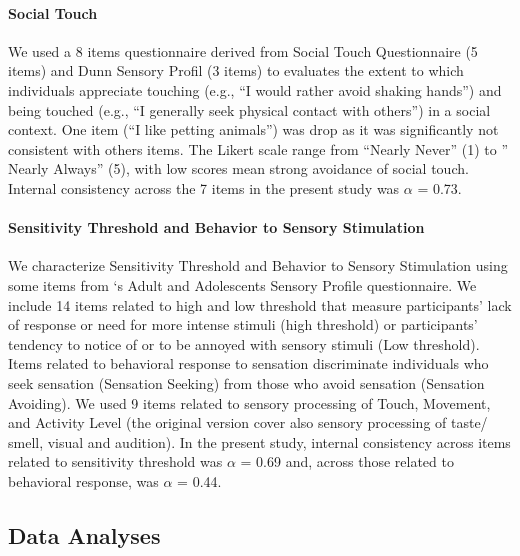 \documentclass[preprint, 3p,
authoryear]{elsarticle} %
\begin{document}
\hypertarget{social-touch}{%
\paragraph{Social Touch}\label{social-touch}}

We used a 8 items questionnaire derived from Social Touch Questionnaire
(5 items) \citep{wilhelm_social_2001} and Dunn Sensory Profil (3
items)\citep{brown_adolescentadult_2002} to evaluates the extent to
which individuals appreciate touching (e.g., ``I would rather avoid
shaking hands'') and being touched (e.g., ``I generally seek physical
contact with others'') in a social context. One item (``I like petting
animals'') was drop as it was significantly not consistent with others
items. The Likert scale range from ``Nearly Never'' (1) to '' Nearly
Always'' (5), with low scores mean strong avoidance of social touch.
Internal consistency across the 7 items in the present study was
\(\alpha\) = 0.73.

\hypertarget{sensitivity-threshold-and-behavior-to-sensory-stimulation}{%
\paragraph{Sensitivity Threshold and Behavior to Sensory
Stimulation}\label{sensitivity-threshold-and-behavior-to-sensory-stimulation}}

We characterize Sensitivity Threshold and Behavior to Sensory
Stimulation using some items from \citet{brown_adolescentadult_2002}`s
Adult and Adolescents Sensory Profile questionnaire. We include 14 items
related to high and low threshold that measure participants' lack of
response or need for more intense stimuli (high threshold) or
participants' tendency to notice of or to be annoyed with sensory
stimuli (Low threshold). Items related to behavioral response to
sensation discriminate individuals who seek sensation (Sensation
Seeking) from those who avoid sensation (Sensation Avoiding). We used 9
items related to sensory processing of Touch, Movement, and Activity
Level (the original version cover also sensory processing of taste/
smell, visual and audition). In the present study, internal consistency
across items related to sensitivity threshold was \(\alpha\) = 0.69 and,
across those related to behavioral response, was \(\alpha\) = 0.44.

\hypertarget{data-analyses}{%
\subsection{Data Analyses}\label{data-analyses}}
\end{document}

